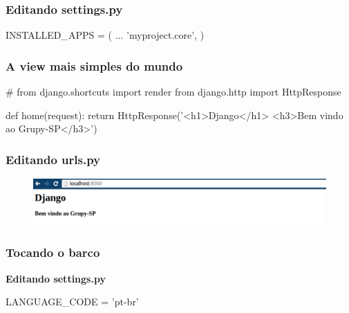 \documentclass{beamer}
\begin{document}
{\begin{frame}
\end{frame}


\begin{frame}[fragile]\frametitle{Editando settings.py}

\begin{pythoncode}
INSTALLED_APPS = (
    ...
    'myproject.core',
)
\end{pythoncode}

\end{frame}


\begin{frame}[fragile]\frametitle{A view mais simples do mundo}

\begin{pythoncode}
# from django.shortcuts import render
from django.http import HttpResponse

def home(request):
    return HttpResponse('<h1>Django</h1>
                         <h3>Bem vindo ao Grupy-SP</h3>')
\end{pythoncode}

\end{frame}


\begin{frame}[fragile]\frametitle{Editando urls.py}


\end{frame}

\begin{frame}

    \begin{figure}[h]
      \centering
        \includegraphics[width=\paperwidth]{img/HttpResponse.png}
    \end{figure}

\end{frame}


\begin{frame}[fragile]\frametitle{Tocando o barco}

\textbf{Editando settings.py}

\begin{pythoncode}
LANGUAGE_CODE = 'pt-br'


\end{pythoncode}
\end{frame}}
\end{document}
